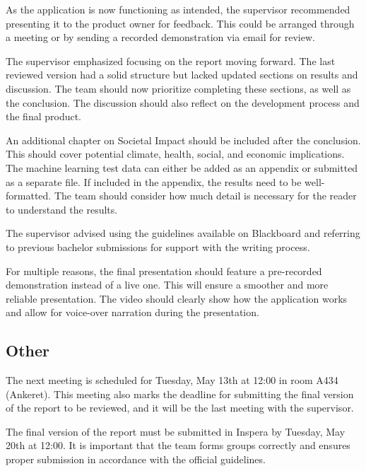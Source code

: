 As the application is now functioning as intended, the supervisor recommended presenting it to the product owner for feedback. This could be arranged through a meeting or by sending a recorded demonstration via email for review.

The supervisor emphasized focusing on the report moving forward. The last reviewed version had a solid structure but lacked updated sections on results and discussion. The team should now prioritize completing these sections, as well as the conclusion. The discussion should also reflect on the development process and the final product.

An additional chapter on Societal Impact should be included after the conclusion. This should cover potential climate, health, social, and economic implications. The machine learning test data can either be added as an appendix or submitted as a separate file. If included in the appendix, the results need to be well-formatted. The team should consider how much detail is necessary for the reader to understand the results.

The supervisor advised using the guidelines available on Blackboard and referring to previous bachelor submissions for support with the writing process.

For multiple reasons, the final presentation should feature a pre-recorded demonstration instead of a live one. This will ensure a smoother and more reliable presentation. The video should clearly show how the application works and allow for voice-over narration during the presentation.

\subsection{Other}
The next meeting is scheduled for Tuesday, May 13th at 12:00 in room A434 (Ankeret). This meeting also marks the deadline for submitting the final version of the report to be reviewed, and it will be the last meeting with the supervisor.

The final version of the report must be submitted in Inspera by Tuesday, May 20th at 12:00. It is important that the team forms groups correctly and ensures proper submission in accordance with the official guidelines.